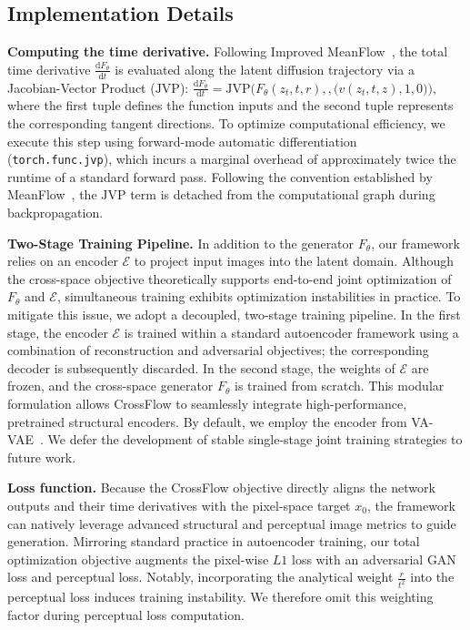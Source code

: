 
\subsection{Implementation Details}

\textbf{Computing the time derivative.} Following Improved MeanFlow~\citep{imf}, the total time derivative $\frac{\mathrm dF_{\theta}}{\mathrm dt}$ is evaluated along the latent diffusion trajectory via a Jacobian-Vector Product ($\mathrm{JVP}$):
$\frac{\mathrm dF_{\theta}}{\mathrm dt} = \mathrm{JVP}\Big(F_\theta(z_t, t, r), , \big(v(z_t, t, z), 1, 0\big)\Big),$
where the first tuple defines the function inputs and the second tuple represents the corresponding tangent directions. To optimize computational efficiency, we execute this step using forward-mode automatic differentiation (\texttt{torch.func.jvp}), which incurs a marginal overhead of approximately twice the runtime of a standard forward pass. Following the convention established by MeanFlow~\citep{meanflow}, the $\mathrm{JVP}$ term is detached from the computational graph during backpropagation.

\textbf{Two-Stage Training Pipeline.} In addition to the generator $F_{\theta}$, our framework relies on an encoder $\mathcal{E}$ to project input images into the latent domain. Although the cross-space objective theoretically supports end-to-end joint optimization of $F_{\theta}$ and $\mathcal{E}$, simultaneous training exhibits optimization instabilities in practice. To mitigate this issue, we adopt a decoupled, two-stage training pipeline. In the first stage, the encoder $\mathcal{E}$ is trained within a standard autoencoder framework using a combination of reconstruction and adversarial objectives; the corresponding decoder is subsequently discarded. In the second stage, the weights of $\mathcal{E}$ are frozen, and the cross-space generator $F_{\theta}$ is trained from scratch. This modular formulation allows CrossFlow to seamlessly integrate high-performance, pretrained structural encoders. By default, we employ the encoder from VA-VAE~\citep{VAVAE}. We defer the development of stable single-stage joint training strategies to future work.

\textbf{Loss function.} Because the CrossFlow objective directly aligns the network outputs and their time derivatives with the pixel-space target $x_0$, the framework can natively leverage advanced structural and perceptual image metrics to guide generation. Mirroring standard practice in autoencoder training, our total optimization objective augments the pixel-wise $L1$ loss with an adversarial GAN loss and perceptual loss. Notably, incorporating the analytical weight $\frac{r}{t^2}$ into the perceptual loss induces training instability. We therefore omit this weighting factor during perceptual loss computation.


